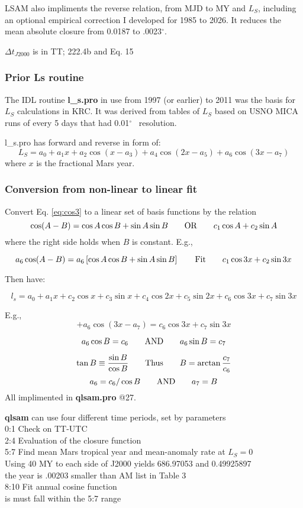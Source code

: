 \documentclass[draft]{article}
\newcommand{\qbn}{\begin{equation}}      %
\newcommand{\qen}{\end{equation}}
\newcommand{\qr}[1]{Eq. \ref{eq:#1}}  %
\newcommand{\qi}{\\ \hspace*{2.em}}      %
\newcommand{\qii}{\\ \hspace*{4.em}}     %
\newcommand{\qiii}{\\ \hspace*{6.em}}    %
\newcommand{\qd}{$^\circ$}        %
\newcommand{\mc}[1]{\hspace{7mm} \mathrm{#1} \hspace{7mm}} %
\newcommand{\np}{\textbf}  %
\newcommand{\ql}[1]{\label{eq:#1} \end{equation} } %
\begin{document}
LSAM also impliments the reverse relation, from MJD to MY and $L_S$, including
an optional empirical correction I developed for 1985 to 2026. It reduces the
mean absolute closure from 0.0187 to .0023\qd.

$\Delta t_{J2000}$ is in TT;  222.4b and Eq. 15
 
\subsubsection{Prior Ls routine} 
The IDL routine \np{l\_s.pro} in use from 1997 (or earlier) to 2011 was the
basis for $L_S$ calculations in KRC. It was derived from tables of $L_S$ based
on USNO MICA runs of every 5 days that had 0.01\qd~ resolution.


l\_s.pro has forward and reverse in form of:
\qbn L_S= a_0 + a_1 x + a_2 \cos(x-a_3)+a_4 \cos (2x-a_5) + a_6 \cos(3x-a_7) \ql{cos3}
where $x$ is the fractional Mars year.
\subsubsection{Conversion from non-linear to linear fit}

Convert \qr{cos3} to a linear set of basis functions by the relation
\qbn \cos(A-B)= \cos A \cos B +\sin A  \sin B  \mc{OR} 
 c_1 \cos A +c_2 \sin A  \qen
where the right side holds when $B$ is constant. E.g., 

\qbn a_6  \cos(A-B)= a_6 \left[\cos A \cos B +\sin A  \sin B \right] \mc{Fit} 
 c_1 \cos 3x  +c_2 \sin 3x  \qen

 Then have:

\qbn l_s= a_0 + a_1 x + c_2 \cos x + c_3 \sin x +c_4 \cos 2x + c_5 \sin 2x +c_6 \cos 3x +c_7 \sin 3x \qen

E.g., \qbn + a_6 \cos(3x-a_7)=  c_6 \cos 3x +c_7 \sin 3x  \qen

\qbn  a_6 \cos B =  c_6 \mc{AND}  a_6 \sin B =  c_7 \qen

\qbn \tan B \equiv \frac{\sin B}{\cos B} \mc{Thus} B=\arctan \frac{c_7}{c_6}  \qen
\qbn  a_6= c_6 / \cos B   \mc{AND}   a_7= B \qen
All implimented in \np{qlsam.pro} @27.

 \np{qlsam} can use four different time periods, set by parameters
\qi 0:1 Check on TT-UTC
\qi 2:4 Evaluation of the closure function
\qi 5:7 Find mean Mars tropical year and mean-anomaly rate at $L_S=0$
\qii Using 40 MY to each side of J2000 yields  686.97053 and  0.49925897
\qiii the year is .00203 smaller than AM list in Table 3
\qi 8:10 Fit annual cosine function 
\qiii is must fall within the 5:7 range 
\end{document}

